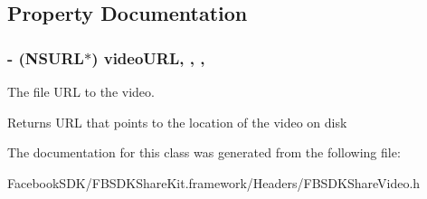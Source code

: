 \subsection{Property Documentation}
\hypertarget{interface_f_b_s_d_k_share_video_afdccd7554a53514993ba881300edecc5}{
\subsubsection[{video\-U\-R\-L}]{\setlength{\rightskip}{0pt plus 5cm}-\/ (N\-S\-U\-R\-L$\ast$) video\-U\-R\-L\hspace{0.3cm}{\ttfamily [read]}, {\ttfamily [write]}, {\ttfamily [nonatomic]}, {\ttfamily [copy]}}}\label{interface_f_b_s_d_k_share_video_afdccd7554a53514993ba881300edecc5}
The file U\-R\-L to the video. \begin{DoxyReturn}{Returns}
U\-R\-L that points to the location of the video on disk 
\end{DoxyReturn}


The documentation for this class was generated from the following file\-:\begin{DoxyCompactItemize}
\item 
Facebook\-S\-D\-K/\-F\-B\-S\-D\-K\-Share\-Kit.\-framework/\-Headers/F\-B\-S\-D\-K\-Share\-Video.\-h\end{DoxyCompactItemize}
